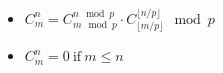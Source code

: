\begin{itemize}
    \item $C^n_m = C^{n \mod p}_{m \mod p} \cdot C^{\lfloor n / p \rfloor}_{\lfloor m / p \rfloor} \mod p$
    \item $C^n_m = 0 ~ \text{if} ~ m \le n$
\end{itemize}

